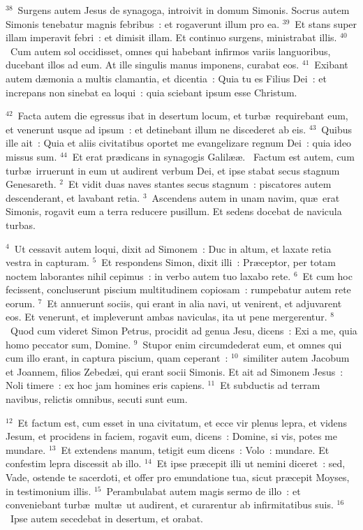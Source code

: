 ${}^{38}$~Surgens autem Jesus de synagoga, introivit in domum Simonis. Socrus autem Simonis tenebatur magnis febribus~: et rogaverunt illum pro ea.
${}^{39}$~Et stans super illam imperavit febri~: et dimisit illam. Et continuo surgens, ministrabat illis.
${}^{40}$~Cum autem sol occidisset, omnes qui habebant infirmos variis languoribus, ducebant illos ad eum. At ille singulis manus imponens, curabat eos.
${}^{41}$~Exibant autem d\ae monia a multis clamantia, et dicentia~: Quia tu es Filius Dei~: et increpans non sinebat ea loqui~: quia sciebant ipsum esse Christum.


${}^{42}$~Facta autem die egressus ibat in desertum locum, et turb\ae\ requirebant eum, et venerunt usque ad ipsum~: et detinebant illum ne discederet ab eis.
${}^{43}$~Quibus ille ait~: Quia et aliis civitatibus oportet me evangelizare regnum Dei~: quia ideo missus sum.
${}^{44}$~Et erat pr\ae dicans in synagogis Galil\ae \ae .
~Factum est autem, cum turb\ae\ irruerunt in eum ut audirent verbum Dei, et ipse stabat secus stagnum Genesareth.
${}^{2}$~Et vidit duas naves stantes secus stagnum~: piscatores autem descenderant, et lavabant retia.
${}^{3}$~Ascendens autem in unam navim, qu\ae\ erat Simonis, rogavit eum a terra reducere pusillum. Et sedens docebat de navicula turbas.


${}^{4}$~Ut cessavit autem loqui, dixit ad Simonem~: Duc in altum, et laxate retia vestra in capturam.
${}^{5}$~Et respondens Simon, dixit illi~: Pr\ae ceptor, per totam noctem laborantes nihil cepimus~: in verbo autem tuo laxabo rete.
${}^{6}$~Et cum hoc fecissent, concluserunt piscium multitudinem copiosam~: rumpebatur autem rete eorum.
${}^{7}$~Et annuerunt sociis, qui erant in alia navi, ut venirent, et adjuvarent eos. Et venerunt, et impleverunt ambas naviculas, ita ut pene mergerentur.
${}^{8}$~Quod cum videret Simon Petrus, procidit ad genua Jesu, dicens~: Exi a me, quia homo peccator sum, Domine.
${}^{9}$~Stupor enim circumdederat eum, et omnes qui cum illo erant, in captura piscium, quam ceperant~:
${}^{10}$~similiter autem Jacobum et Joannem, filios Zebed\ae i, qui erant socii Simonis. Et ait ad Simonem Jesus~: Noli timere~: ex hoc jam homines eris capiens.
${}^{11}$~Et subductis ad terram navibus, relictis omnibus, secuti sunt eum.


${}^{12}$~Et factum est, cum esset in una civitatum, et ecce vir plenus lepra, et videns Jesum, et procidens in faciem, rogavit eum, dicens~: Domine, si vis, potes me mundare.
${}^{13}$~Et extendens manum, tetigit eum dicens~: Volo~: mundare. Et confestim lepra discessit ab illo.
${}^{14}$~Et ipse pr\ae cepit illi ut nemini diceret~: sed, Vade, ostende te sacerdoti, et offer pro emundatione tua, sicut pr\ae cepit Moyses, in testimonium illis.
${}^{15}$~Perambulabat autem magis sermo de illo~: et conveniebant turb\ae\ mult\ae\ ut audirent, et curarentur ab infirmitatibus suis.
${}^{16}$~Ipse autem secedebat in desertum, et orabat.


